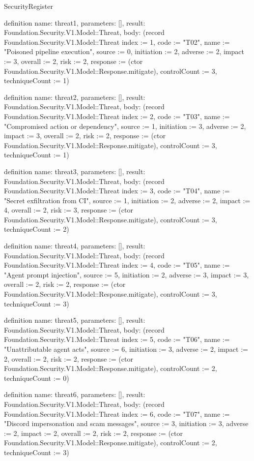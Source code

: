 \begin{lexlean}{SecurityRegister}
\begin{semanticmodule}
definition{
  name: threat1,
  parameters: [],
  result: Foundation.Security.V1.Model::Threat,
  body: (record Foundation.Security.V1.Model::Threat {index := 1, code := "T02", name := "Poisoned pipeline execution", source := 0, initiation := 2, adverse := 2, impact := 3, overall := 2, risk := 2, response := (ctor Foundation.Security.V1.Model::Response.mitigate), controlCount := 3, techniqueCount := 1})
}

definition{
  name: threat2,
  parameters: [],
  result: Foundation.Security.V1.Model::Threat,
  body: (record Foundation.Security.V1.Model::Threat {index := 2, code := "T03", name := "Compromised action or dependency", source := 1, initiation := 3, adverse := 2, impact := 3, overall := 2, risk := 2, response := (ctor Foundation.Security.V1.Model::Response.mitigate), controlCount := 3, techniqueCount := 1})
}

definition{
  name: threat3,
  parameters: [],
  result: Foundation.Security.V1.Model::Threat,
  body: (record Foundation.Security.V1.Model::Threat {index := 3, code := "T04", name := "Secret exfiltration from CI", source := 1, initiation := 2, adverse := 2, impact := 4, overall := 2, risk := 3, response := (ctor Foundation.Security.V1.Model::Response.mitigate), controlCount := 3, techniqueCount := 2})
}

definition{
  name: threat4,
  parameters: [],
  result: Foundation.Security.V1.Model::Threat,
  body: (record Foundation.Security.V1.Model::Threat {index := 4, code := "T05", name := "Agent prompt injection", source := 5, initiation := 2, adverse := 3, impact := 3, overall := 2, risk := 2, response := (ctor Foundation.Security.V1.Model::Response.mitigate), controlCount := 3, techniqueCount := 3})
}

definition{
  name: threat5,
  parameters: [],
  result: Foundation.Security.V1.Model::Threat,
  body: (record Foundation.Security.V1.Model::Threat {index := 5, code := "T06", name := "Unattributable agent acts", source := 6, initiation := 3, adverse := 2, impact := 2, overall := 2, risk := 2, response := (ctor Foundation.Security.V1.Model::Response.mitigate), controlCount := 2, techniqueCount := 0})
}

definition{
  name: threat6,
  parameters: [],
  result: Foundation.Security.V1.Model::Threat,
  body: (record Foundation.Security.V1.Model::Threat {index := 6, code := "T07", name := "Discord impersonation and scam messages", source := 3, initiation := 3, adverse := 2, impact := 2, overall := 2, risk := 2, response := (ctor Foundation.Security.V1.Model::Response.mitigate), controlCount := 2, techniqueCount := 3})
}


\end{semanticmodule}
\end{lexlean}
